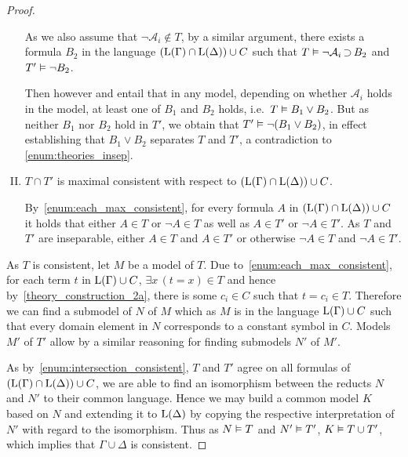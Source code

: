 \begin{proof}
\begin{enumerate}[I.]
			As we also assume that $\lnot \mathcal{A}_i \not\in T$, by a similar argument, there exists a formula $B_2$ in the language  $(\operatorname{L}(\Gamma) \cap \operatorname{L}(\Delta)) \cup C$ such that 
			\markB{} $T \vDash \lnot \mathcal{A}_i \operatorname{\supset} B_2$ and $T' \vDash \lnot B_2$.

			Then however \markA{} and \markB{} entail that in any model, depending on whether $\mathcal{A}_i$ holds in the model, at least one of $B_1$ and $B_2$ holds, i.e.\ $T \vDash B_1 \lor B_2$.
			But as neither $B_1$ nor $B_2$ hold in $T'$, we obtain that $T' \vDash \lnot (B_1 \lor B_2)$, in effect establishing that $B_1 \lor B_2$ separates $T$ and $T'$, a contradiction to \ref{enum:theories_insep}.


		\item
			\label{enum:intersection_consistent}
			$T \cap T'$ is maximal consistent with respect to $(\operatorname{L}(\Gamma) \cap \operatorname{L}(\Delta)) \cup C$.

			By~\ref{enum:each_max_consistent}, for every formula $A$ in $(\operatorname{L}(\Gamma) \cap \operatorname{L}(\Delta)) \cup C$ it holds that either 
			$A \in T$ or $\lnot A \in T$ as well as
			$A \in T'$ or $\lnot A \in T'$. As $T$ and $T'$ are inseparable, either $A \in T$ and $A\in T'$ or otherwise $\lnot A \in T$ and $\lnot A \in T'$.

	\end{enumerate}


	As $T$ is consistent, let $M$ be a model of $T$.
	Due to~\ref{enum:each_max_consistent}, for each term $t$ in $\operatorname{L}(\Gamma)\cup C$, $\exists x\, (t = x) \in T$ and hence by~\ref{theory_construction_2a}, there is some $c_i \in C$ such that $t=c_i \in T$.
	Therefore we can find a submodel of $N$ of $M$ which as $M$ is in the language $\operatorname{L}(\Gamma)\cup C$ such that
	every domain element in $N$ corresponds to a constant symbol in $C$.
	Models $M'$ of $T'$ allow by a similar reasoning for finding submodels $N'$ of $M'$.

	As by~\ref{enum:intersection_consistent}, $T$ and $T'$ agree on all formulas of $(\operatorname{L}(\Gamma) \cap \operatorname{L}(\Delta))\cup C$, 
	we are able to find an isomorphism between the reducts $N$ and $N'$ to their common language.
	Hence we may build a common model $K$ based on $N$ and extending it to $\operatorname{L}(\Delta)$ by copying the respective interpretation of $N'$ with regard to the isomorphism.
	Thus as $N\vDash T$ and $N'\vDash T'$, $K\vDash T \cup T'$, which implies that $\Gamma\cup\Delta$ is consistent.
\end{proof}

